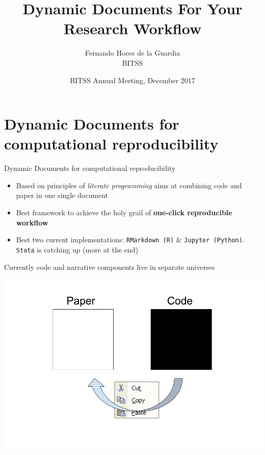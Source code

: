 \documentclass[ignorenonframetext,]{beamer}
\title{Dynamic Documents For Your Research Workflow}
\author{Fernando Hoces de la Guardia\\
BITSS}
\date{BITSS Annual Meeting, December 2017}
\providecommand{\tightlist}{%
\setlength{\itemsep}{0pt}\setlength{\parskip}{0pt}}
\begin{document}
\frame{\titlepage}

\begin{frame}
\tableofcontents[hideallsubsections]
\end{frame}

\section{Dynamic Documents for computational
reproducibility}\label{dynamic-documents-for-computational-reproducibility}

\begin{frame}[fragile]{Dynamic Documents for computational
reproducibility}

\begin{itemize}
\tightlist
\item
  Based on principles of \emph{literate programming} aims at combining
  code and paper in one single document
\item
  Best framework to achieve the holy grail of \textbf{one-click
  reproducible workflow}
\item
  Best two current implementations: \texttt{RMarkdown\ (R)} \&
  \texttt{Jupyter\ (Python)}. \texttt{Stata} is catching up (more at the
  end)
\end{itemize}

\end{frame}

\begin{frame}{Currently code and narrative components live in separate
universes}

\includegraphics{./Two universes.png}

\end{frame}
\end{document}
